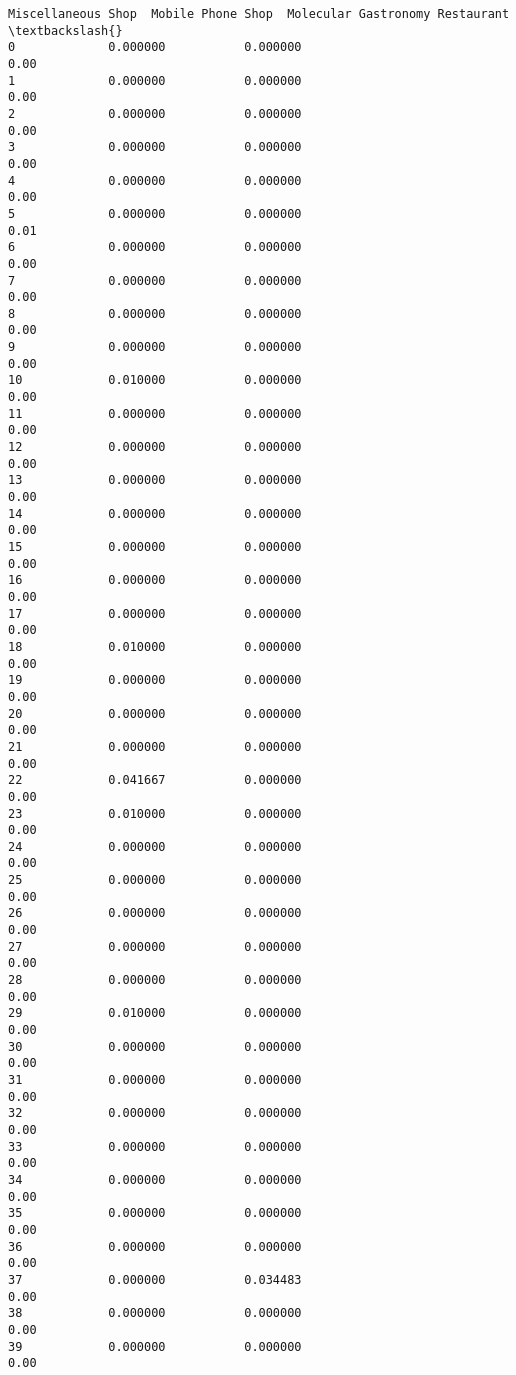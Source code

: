 \documentclass[11pt]{article}
\begin{document}
\begin{tcolorbox}[breakable, size=fbox, boxrule=.5pt, pad at break*=1mm, opacityfill=0]
\begin{Verbatim}[commandchars=\\\{\}]
    Miscellaneous Shop  Mobile Phone Shop  Molecular Gastronomy Restaurant  \textbackslash{}
0             0.000000           0.000000                             0.00
1             0.000000           0.000000                             0.00
2             0.000000           0.000000                             0.00
3             0.000000           0.000000                             0.00
4             0.000000           0.000000                             0.00
5             0.000000           0.000000                             0.01
6             0.000000           0.000000                             0.00
7             0.000000           0.000000                             0.00
8             0.000000           0.000000                             0.00
9             0.000000           0.000000                             0.00
10            0.010000           0.000000                             0.00
11            0.000000           0.000000                             0.00
12            0.000000           0.000000                             0.00
13            0.000000           0.000000                             0.00
14            0.000000           0.000000                             0.00
15            0.000000           0.000000                             0.00
16            0.000000           0.000000                             0.00
17            0.000000           0.000000                             0.00
18            0.010000           0.000000                             0.00
19            0.000000           0.000000                             0.00
20            0.000000           0.000000                             0.00
21            0.000000           0.000000                             0.00
22            0.041667           0.000000                             0.00
23            0.010000           0.000000                             0.00
24            0.000000           0.000000                             0.00
25            0.000000           0.000000                             0.00
26            0.000000           0.000000                             0.00
27            0.000000           0.000000                             0.00
28            0.000000           0.000000                             0.00
29            0.010000           0.000000                             0.00
30            0.000000           0.000000                             0.00
31            0.000000           0.000000                             0.00
32            0.000000           0.000000                             0.00
33            0.000000           0.000000                             0.00
34            0.000000           0.000000                             0.00
35            0.000000           0.000000                             0.00
36            0.000000           0.000000                             0.00
37            0.000000           0.034483                             0.00
38            0.000000           0.000000                             0.00
39            0.000000           0.000000                             0.00


\end{Verbatim}
\end{tcolorbox}
\end{document}
